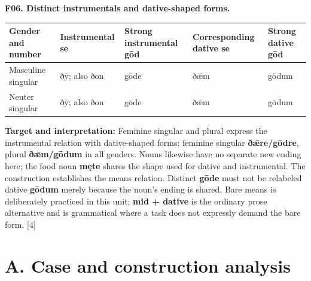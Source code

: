 \par\begin{minipage}{\linewidth}\raggedright
\textbf{F06. Distinct instrumentals and dative-shaped forms.}

\par\begingroup
\fontsize{10.5}{13.2}\selectfont
\setlength{\LTleft}{0pt}\setlength{\LTright}{\fill}
\noindent
\begin{tabular}{@{}>{\raggedright\arraybackslash}p{20.49mm}>{\raggedright\arraybackslash}p{23.44mm}>{\raggedright\arraybackslash}p{26.12mm}>{\raggedright\arraybackslash}p{25.5mm}>{\raggedright\arraybackslash}p{17.2mm}@{}}
\toprule
\textbf{Gender and number} & \textbf{Instrumental se} & \textbf{Strong instrumental gōd} & \textbf{Corresponding dative se} & \textbf{Strong dative gōd} \\
\midrule
Masculine singular & ðȳ; also ðon & gōde & ðǣm & gōdum \\
Neuter singular & ðȳ; also ðon & gōde & ðǣm & gōdum \\
\bottomrule
\end{tabular}
\par\endgroup

\textbf{Target and interpretation:} Feminine singular and plural express the instrumental relation with dative-shaped forms: feminine singular \textbf{ðǣre/\allowbreak{}gōdre}, plural \textbf{ðǣm/\allowbreak{}gōdum} in all genders. Nouns likewise have no separate new ending here; the food noun \textbf{męte} shares the shape used for dative and instrumental. The construction establishes the means relation. Distinct \textbf{gōde} must not be relabeled dative \textbf{gōdum} merely because the noun's ending is shared. Bare means is deliberately practiced in this unit; \textbf{mid + dative} is the ordinary prose alternative and is grammatical where a task does not expressly demand the bare form. [4]

\end{minipage}\par\addvspace{4pt}

\section*{A. Case and construction analysis}

